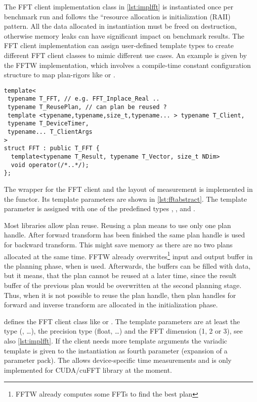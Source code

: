 The FFT client implementation class in \cref{lst:implfft} is instantiated once per benchmark run and follows the ``resource allocation is initialization (RAII) pattern.
All the data allocated in instantiation must be freed on destruction, otherwise memory leaks can have significant impact on benchmark results.
The FFT client implementation can assign user-defined template types to create different FFT client classes to mimic different use cases. An example is given by the FFTW implementation, which involves a compile-time constant configuration structure to map plan-rigors like  or .

\begin{lstlisting}[caption={FFT wrapper class},label={lst:fftabstract}]
template<
 typename T_FFT, // e.g. FFT_Inplace_Real ..
 typename T_ReusePlan, // can plan be reused ?
 template <typename,typename,size_t,typename... > typename T_Client,
 typename T_DeviceTimer,
 typename... T_ClientArgs
>
struct FFT : public T_FFT {
  template<typename T_Result, typename T_Vector, size_t NDim>
  void operator(/*..*/);
};
\end{lstlisting}

The wrapper for the FFT client and the layout of measurement is implemented in the  functor.
Its template parameters are shown in \cref{lst:fftabstract}. 
The template parameter  is assigned with one of the predefined types , ,  and .

Most libraries allow plan reuse.
Reusing a plan means to use only one plan handle. After forward transform has been finished the same plan handle is used for backward transform.
This might save memory as there are no two plans allocated at the same time. FFTW already overwrites\footnote{FFTW already computes some FFTs to find the best plan} input and output buffer in the planning phase, when  is used. Afterwards, the buffers can be filled with data, but it means, that the plan cannot be reused at a later time, since the result buffer of the previous plan would be overwritten at the second planning stage.
Thus, when it is not possible to reuse the plan handle, then plan handles for forward and inverse transform are allocated in the initialization phase.

 defines the FFT client class like  or .
The template parameters are at least the  type (, \ldots), the precision type (float, \ldots) and the FFT dimension (1, 2 or 3), see also \cref{lst:implfft}. If the client needs more template arguments the variadic template  is given to the  instantiation as fourth parameter (expansion of a parameter pack).
The  allows device-specific time measurements and is only implemented for CUDA/cuFFT library at the moment.

